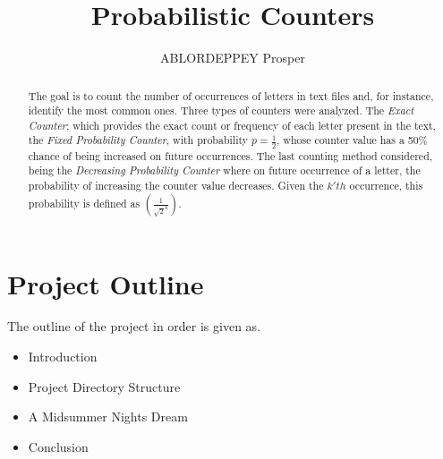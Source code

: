 \documentclass[longpaper, english, final, times]{revdetua}
\begin{document}
	
	
	\title{Probabilistic Counters}
	\author{ABLORDEPPEY Prosper} %
	\maketitle
	
	\begin{abstract}%
		The goal is to count the number of occurrences of letters in text files and, for instance, identify the most common ones. Three types of counters were analyzed. The \textit{Exact Counter}; which provides the exact count or frequency of each letter present in the text, the \textit{Fixed Probability Counter}, with probability $p=\frac{1}{2}$, whose counter value has a 50\% chance of being increased on future occurrences. The last counting method considered, being the \textit{Decreasing Probability Counter} where on future occurrence of a letter, the probability of increasing the counter value decreases. Given the $k'th$ occurrence, this probability  is defined as $\left(\frac{1}{\sqrt{2}^k}\right)$.
	\end{abstract}
	
	
	
	
	\section*{Project Outline}
		The outline of the project in order is given as.
		\begin{itemize}
			\item Introduction
			\item Project Directory Structure
			\item A Midsummer Nights Dream
			\item Conclusion
		\end{itemize}
\end{document}
